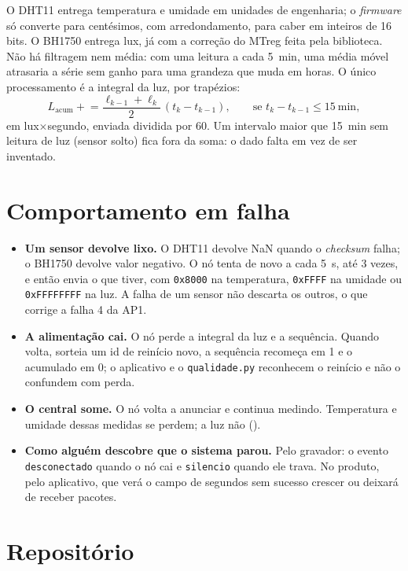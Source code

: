 O DHT11 entrega temperatura e umidade em unidades de engenharia; o
\emph{firmware} só converte para centésimos, com arredondamento, para
caber em inteiros de 16 bits. O BH1750 entrega lux, já com a correção do
MTreg feita pela biblioteca. Não há filtragem nem média: com uma leitura a
cada \SI{5}{\minute}, uma média móvel atrasaria a série sem ganho para uma
grandeza que muda em horas. O único processamento é a integral da luz, por
trapézios:
\[
  \textstyle L_{\text{acum}} \mathrel{+}= \frac{\ell_{k-1} + \ell_k}{2}\,(t_k - t_{k-1}),
  \qquad \text{se } t_k - t_{k-1} \leq \SI{15}{\minute},
\]
em lux$\times$segundo, enviada dividida por 60. Um intervalo maior que
\SI{15}{\minute} sem leitura de luz (sensor solto) fica fora da soma: o
dado falta em vez de ser inventado.

\section{Comportamento em falha}
\label{sec:falha}

\begin{itemize}
  \item \textbf{Um sensor devolve lixo.} O DHT11 devolve NaN quando o
    \emph{checksum} falha; o BH1750 devolve valor negativo. O nó tenta de
    novo a cada \SI{5}{\second}, até 3 vezes, e então envia o que tiver,
    com \texttt{0x8000} na temperatura, \texttt{0xFFFF} na umidade ou
    \texttt{0xFFFFFFFF} na luz. A falha de um sensor não descarta os
    outros, o que corrige a falha 4 da AP1.
  \item \textbf{A alimentação cai.} O nó perde a integral da luz e a
    sequência. Quando volta, sorteia um id de reinício novo, a sequência
    recomeça em 1 e o acumulado em 0; o aplicativo e o
    \texttt{qualidade.py} reconhecem o reinício e não o confundem com
    perda.
  \item \textbf{O central some.} O nó volta a anunciar e continua medindo.
    Temperatura e umidade dessas medidas se perdem; a luz não ().
  \item \textbf{Como alguém descobre que o sistema parou.} Pelo gravador:
    o evento \texttt{desconectado} quando o nó cai e \texttt{silencio}
    quando ele trava. No produto, pelo aplicativo, que verá o campo de
    segundos sem sucesso crescer ou deixará de receber pacotes.
\end{itemize}

\section{Repositório}

